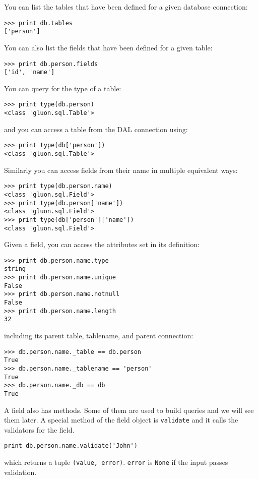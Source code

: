 \documentclass[justified,sixbynine,notoc]{tufte-book}
\def\ft{\small\tt}
\def\inxx#1{\index{#1}}
\begin{document}
\begin{fullwidth}
You can list the tables that have been defined for a given database connection:

\inxx{tables}
\begin{lstlisting}
>>> print db.tables
['person']
\end{lstlisting}

You can also list the fields that have been defined for a given table:

\inxx{fields}
\begin{lstlisting}
>>> print db.person.fields
['id', 'name']
\end{lstlisting}

You can query for the type of a table:

\inxx{Table}
\begin{lstlisting}
>>> print type(db.person)
<class 'gluon.sql.Table'>
\end{lstlisting}
\noindent and you can access a table from the DAL connection using:
\begin{lstlisting}
>>> print type(db['person'])
<class 'gluon.sql.Table'>
\end{lstlisting}

Similarly you can access fields from their name in multiple equivalent ways:
\begin{lstlisting}
>>> print type(db.person.name)
<class 'gluon.sql.Field'>
>>> print type(db.person['name'])
<class 'gluon.sql.Field'>
>>> print type(db['person']['name'])
<class 'gluon.sql.Field'>
\end{lstlisting}

Given a field, you can access the attributes set in its definition:
\begin{lstlisting}
>>> print db.person.name.type
string
>>> print db.person.name.unique
False
>>> print db.person.name.notnull
False
>>> print db.person.name.length
32
\end{lstlisting}
\noindent including its parent table, tablename, and parent connection:
\begin{lstlisting}
>>> db.person.name._table == db.person
True
>>> db.person.name._tablename == 'person'
True
>>> db.person.name._db == db
True
\end{lstlisting}

A field also has methods. Some of them are used to build queries and we will see them later.
A special method of the field object is {\ft validate} and it calls the validators for the field.

\begin{lstlisting}
print db.person.name.validate('John')
\end{lstlisting}
\noindent which returns a tuple {\ft (value, error)}. {\ft error} is {\ft None} if the input passes validation.


\end{fullwidth}
\end{document}
